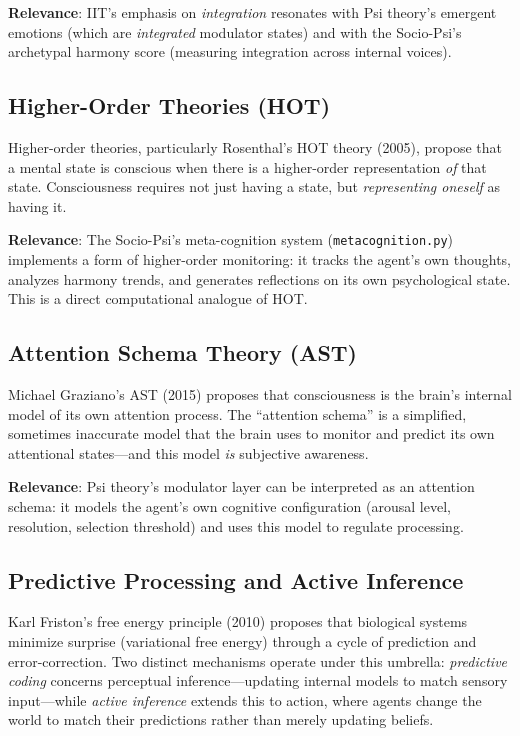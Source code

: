 \documentclass[11pt,letterpaper]{article}
\begin{document}
\textbf{Relevance}: IIT's emphasis on \emph{integration} resonates with
Psi theory's emergent emotions (which are \emph{integrated} modulator
states) and with the Socio-Psi's archetypal harmony score (measuring
integration across internal voices).

\subsection{Higher-Order Theories (HOT)}

Higher-order theories, particularly Rosenthal's HOT theory (2005), propose
that a mental state is conscious when there is a higher-order representation
\emph{of} that state. Consciousness requires not just having a state, but
\emph{representing oneself} as having it.

\textbf{Relevance}: The Socio-Psi's meta-cognition system
(\texttt{metacognition.py}) implements a form of higher-order monitoring:
it tracks the agent's own thoughts, analyzes harmony trends, and generates
reflections on its own psychological state. This is a direct computational
analogue of HOT.

\subsection{Attention Schema Theory (AST)}

Michael Graziano's AST (2015) proposes that consciousness is the brain's
internal model of its own attention process. The ``attention schema'' is a
simplified, sometimes inaccurate model that the brain uses to monitor and
predict its own attentional states---and this model \emph{is} subjective
awareness.

\textbf{Relevance}: Psi theory's modulator layer can be interpreted as
an attention schema: it models the agent's own cognitive configuration
(arousal level, resolution, selection threshold) and uses this model to
regulate processing.

\subsection{Predictive Processing and Active Inference}

Karl Friston's free energy principle (2010) proposes that biological systems
minimize surprise (variational free energy) through a cycle of prediction and
error-correction. Two distinct mechanisms operate under this umbrella:
\emph{predictive coding} concerns perceptual inference---updating internal
models to match sensory input---while \emph{active inference} extends this
to action, where agents change the world to match their predictions rather
than merely updating beliefs.
\end{document}
